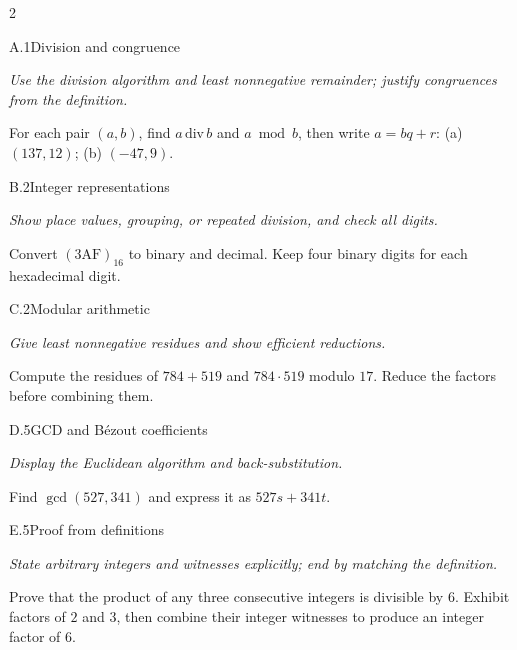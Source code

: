 \documentclass[9pt]{extarticle}
\begin{document}
\begin{multicols}{2}
\begin{CoreProblem}{A.1}{Division and congruence}
{\scriptsize\textit{Use the division algorithm and least nonnegative remainder; justify congruences from the definition.}\par}
For each pair $(a,b)$, find $a\,\mathrm{div}\,b$ and $a\bmod b$, then write
$a=bq+r$: (a) $(137,12)$; (b) $(-47,9)$.
\end{CoreProblem}
\begin{CoreProblem}{B.2}{Integer representations}
{\scriptsize\textit{Show place values, grouping, or repeated division, and check all digits.}\par}
Convert $(\mathrm{3AF})_{16}$ to binary and decimal. Keep four binary digits
for each hexadecimal digit.
\end{CoreProblem}
\begin{CoreProblem}{C.2}{Modular arithmetic}
{\scriptsize\textit{Give least nonnegative residues and show efficient reductions.}\par}
Compute the residues of $784+519$ and $784\cdot519$ modulo $17$. Reduce the
factors before combining them.
\end{CoreProblem}
\columnbreak
\begin{CoreProblem}{D.5}{GCD and B\'ezout coefficients}
{\scriptsize\textit{Display the Euclidean algorithm and back-substitution.}\par}
Find $\gcd(527,341)$ and express it as $527s+341t$.
\end{CoreProblem}
\begin{CoreProblem}{E.5}{Proof from definitions}
{\scriptsize\textit{State arbitrary integers and witnesses explicitly; end by matching the definition.}\par}
Prove that the product of any three consecutive integers is divisible by $6$.
Exhibit factors of $2$ and $3$, then combine their integer witnesses to
produce an integer factor of $6$.
\end{CoreProblem}
\end{multicols}
\CoreWorkArea
\FormBreak
{}
\end{document}
